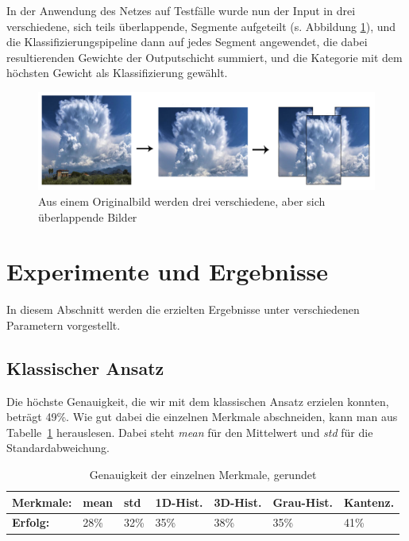 \documentclass[a4,german]{article}
\begin{document}

In der Anwendung des Netzes auf Testfälle wurde nun der Input in drei verschiedene, sich teils überlappende, Segmente aufgeteilt (s. Abbildung \ref{fig:augmentation}), und die Klassifizierungspipeline dann auf jedes Segment angewendet, die dabei resultierenden Gewichte der Outputschicht summiert, und die Kategorie mit dem höchsten Gewicht als Klassifizierung gewählt.

\begin{figure}[h!]
\centering
\includegraphics[width=\textwidth]{Augmentation}
\caption{Aus einem Originalbild werden drei verschiedene, aber sich überlappende Bilder}
    \label{fig:augmentation}
\end{figure}


\section{Experimente und Ergebnisse}
\label{sec:experimente}
In diesem Abschnitt werden die erzielten Ergebnisse unter verschiedenen Parametern vorgestellt.

\subsection{Klassischer Ansatz}%
Die höchste Genauigkeit, die wir mit dem klassischen Ansatz erzielen konnten, beträgt 49\%. Wie gut dabei die einzelnen Merkmale abschneiden, kann man aus Tabelle~\ref{tab:gen} herauslesen. Dabei steht \textit{mean} für den Mittelwert und \textit{std} für die Standardabweichung. 


\begin{table}[h]
\centering
\begin{tabular}{|l|l|l|l|l|l|l|}
 \hline
 \textbf{Merkmale:}&mean&std&1D-Hist.&3D-Hist.&Grau-Hist.&Kantenz.\\
 \hline
 \textbf{Erfolg:} & 28\% & 32\% & 35\% & 38\% & 35\% & 41\% \\
 \hline
\end{tabular}
\caption{Genauigkeit der einzelnen Merkmale, gerundet}
\label{tab:gen}
\end{table}
\end{document}

